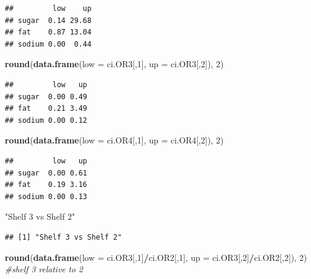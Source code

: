 \documentclass[11pt,]{article}
\newenvironment{Shaded}{\begin{snugshade}}{\end{snugshade}}
\newcommand{\KeywordTok}[1]{\textcolor[rgb]{0.13,0.29,0.53}{\textbf{#1}}}
\newcommand{\DataTypeTok}[1]{\textcolor[rgb]{0.13,0.29,0.53}{#1}}
\newcommand{\DecValTok}[1]{\textcolor[rgb]{0.00,0.00,0.81}{#1}}
\newcommand{\StringTok}[1]{\textcolor[rgb]{0.31,0.60,0.02}{#1}}
\newcommand{\CommentTok}[1]{\textcolor[rgb]{0.56,0.35,0.01}{\textit{#1}}}
\newcommand{\OperatorTok}[1]{\textcolor[rgb]{0.81,0.36,0.00}{\textbf{#1}}}
\newcommand{\NormalTok}[1]{#1}
\begin{document}
\begin{verbatim}
##         low    up
## sugar  0.14 29.68
## fat    0.87 13.04
## sodium 0.00  0.44
\end{verbatim}

\begin{Shaded}
\begin{Highlighting}[]
\KeywordTok{round}\NormalTok{(}\KeywordTok{data.frame}\NormalTok{(}\DataTypeTok{low =}\NormalTok{ ci.OR3[,}\DecValTok{1}\NormalTok{], }\DataTypeTok{up =}\NormalTok{ ci.OR3[,}\DecValTok{2}\NormalTok{]), }\DecValTok{2}\NormalTok{) }
\end{Highlighting}
\end{Shaded}

\begin{verbatim}
##         low   up
## sugar  0.00 0.49
## fat    0.21 3.49
## sodium 0.00 0.12
\end{verbatim}

\begin{Shaded}
\begin{Highlighting}[]
\KeywordTok{round}\NormalTok{(}\KeywordTok{data.frame}\NormalTok{(}\DataTypeTok{low =}\NormalTok{ ci.OR4[,}\DecValTok{1}\NormalTok{], }\DataTypeTok{up =}\NormalTok{ ci.OR4[,}\DecValTok{2}\NormalTok{]), }\DecValTok{2}\NormalTok{) }
\end{Highlighting}
\end{Shaded}

\begin{verbatim}
##         low   up
## sugar  0.00 0.61
## fat    0.19 3.16
## sodium 0.00 0.13
\end{verbatim}

\begin{Shaded}
\begin{Highlighting}[]
\StringTok{"Shelf 3 vs Shelf 2"}
\end{Highlighting}
\end{Shaded}

\begin{verbatim}
## [1] "Shelf 3 vs Shelf 2"
\end{verbatim}

\begin{Shaded}
\begin{Highlighting}[]
\KeywordTok{round}\NormalTok{(}\KeywordTok{data.frame}\NormalTok{(}\DataTypeTok{low =}\NormalTok{ ci.OR3[,}\DecValTok{1}\NormalTok{]}\OperatorTok{/}\NormalTok{ci.OR2[,}\DecValTok{1}\NormalTok{], }\DataTypeTok{up =}\NormalTok{ ci.OR3[,}\DecValTok{2}\NormalTok{]}\OperatorTok{/}\NormalTok{ci.OR2[,}\DecValTok{2}\NormalTok{]), }\DecValTok{2}\NormalTok{) }\CommentTok{#shelf 3 relative to 2}
\end{Highlighting}
\end{Shaded}
\end{document}
